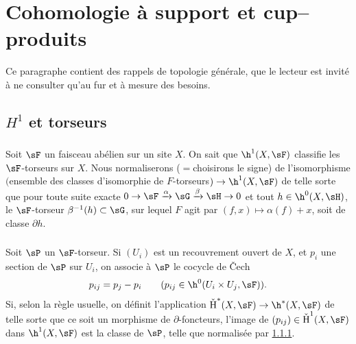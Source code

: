 \section{Cohomologie à support et cup--produits}\label{IV:1}

Ce paragraphe contient des rappels de topologie générale, que le 
lecteur est invité à ne consulter qu'au fur et à mesure des besoins.










\subsection{\texorpdfstring{$H^1$}{H1} et torseurs}\label{IV:1-1}





\subsubsection{}\label{IV:1-1-1}

Soit $\sF$ un faisceau abélien sur un site $X$. On sait que $\h^1(X,\sF)$ 
classifie les $\sF$-torseurs sur $X$. Nous normaliserons ($=$choisirons le 
signe) de l'isomorphisme $($ensemble des classes d'isomorphie de 
$F$-torseurs$)\to \h^1(X,\sF)$ de telle sorte que pour toute suite exacte 
$0\to \sF\xrightarrow\alpha\sG\xrightarrow\beta\sH\to 0$ et tout 
$h\in\h^0(X,\sH)$, le $\sF$-torseur $\beta^{-1}(h)\subset \sG$, sur lequel 
$F$ agit par $(f,x)\mapsto \alpha(f)+x$, soit de classe $\partial h$. 





\subsubsection{}\label{IV:1-1-2}

Soit $\sP$ un $\sF$-torseur. Si $(U_i)$ est un recouvrement ouvert de $X$, et 
$p_i$ une section de $\sP$ sur $U_i$, on associe à $\sP$ le cocycle de 
\v{C}ech
\[
  p_{i j} = p_j - p_i \qquad \text{($p_{i j}\in \h^0(U_i\times U_j,\sF)$).}
\]
Si, selon la règle usuelle, on définit l'application 
$\operatorname{\check H}^*(X,\sF)\to \h^*(X,\sF)$ de telle sorte 
que ce soit un morphisme de $\partial$-foncteurs, l'image de 
$(p_{i j})\in \operatorname{\check H}^1(X,\sF)$ dans $\h^1(X,\sF)$ est la 
classe de $\sP$, telle que normalisée par \ref{IV:1-1-1}. 





